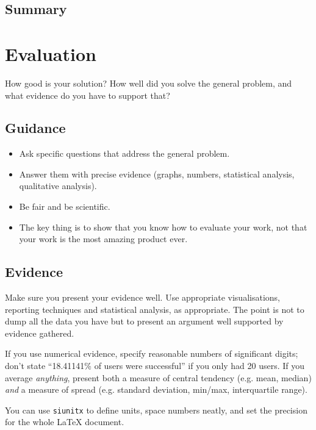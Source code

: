 \documentclass{l4proj}
\begin{document}
\section{Summary}


\chapter{Evaluation}
How good is your solution? How well did you solve the general problem, and what evidence do you have to support that?

\section{Guidance}
\begin{itemize}
      \item
            Ask specific questions that address the general problem.
      \item
            Answer them with precise evidence (graphs, numbers, statistical
            analysis, qualitative analysis).
      \item
            Be fair and be scientific.
      \item
            The key thing is to show that you know how to evaluate your work, not
            that your work is the most amazing product ever.
\end{itemize}

\section{Evidence}
Make sure you present your evidence well. Use appropriate visualisations,
reporting techniques and statistical analysis, as appropriate. The point is not
to dump all the data you have but to present an argument well supported by evidence gathered.

If you use numerical evidence, specify reasonable numbers of significant digits; don't state ``18.41141\% of users were successful'' if you only had 20 users. If you average \textit{anything}, present both a measure of central tendency (e.g. mean, median) \textit{and} a measure of spread (e.g. standard deviation, min/max, interquartile range).

You can use \texttt{siunitx} to define units, space numbers neatly, and set the precision for the whole LaTeX document.
\end{document}
